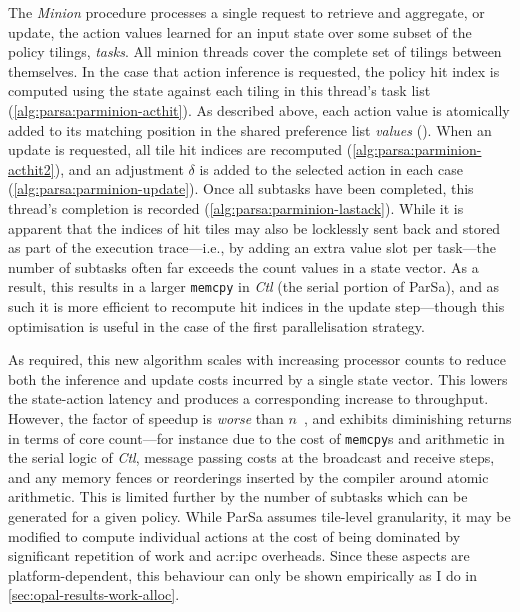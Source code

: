 The \emph{Minion} procedure processes a single request to retrieve and aggregate, or update, the action values learned for an input state over some subset of the policy tilings, \emph{tasks}.
All minion threads cover the complete set of tilings between themselves.
In the case that action inference is requested, the policy hit index is computed using the state against each tiling in this thread's task list (\cref{alg:parsa:parminion-acthit}).
As described above, each action value is atomically added to its matching position in the shared preference list \emph{values} ().
When an update is requested, all tile hit indices are recomputed (\cref{alg:parsa:parminion-acthit2}), and an adjustment $\delta$ is added to the selected action in each case (\cref{alg:parsa:parminion-update}).
Once all subtasks have been completed, this thread's completion is recorded (\cref{alg:parsa:parminion-lastack}).
While it is apparent that the indices of hit tiles may also be locklessly sent back and stored as part of the execution trace---i.e., by adding an extra value slot per task---the number of subtasks often far exceeds the count values in a state vector.
As a result, this results in a larger \texttt{memcpy} in \emph{Ctl} (the serial portion of ParSa), and as such it is more efficient to recompute hit indices in the update step---though this optimisation is useful in the case of the first parallelisation strategy.

As required, this new algorithm scales with increasing processor counts to reduce both the inference and update costs incurred by a single state vector.
This lowers the state-action latency and produces a corresponding increase to throughput.
However, the factor of speedup is \emph{worse} than $n$~\unit{\times}, and exhibits diminishing returns in terms of core count---for instance due to the cost of \texttt{memcpy}s and arithmetic in the serial logic of \emph{Ctl}, message passing costs at the broadcast and receive steps, and any memory fences or reorderings inserted by the compiler around atomic arithmetic.
This is limited further by the number of subtasks which can be generated for a given policy.
While ParSa assumes tile-level granularity, it may be modified to compute individual actions at the cost of being dominated by significant repetition of work and \gls{acr:ipc} overheads.
Since these aspects are platform-dependent, this behaviour can only be shown empirically as I do in \cref{sec:opal-results-work-alloc}.